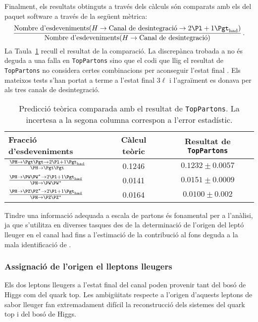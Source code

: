 Finalment, els resultats obtinguts a través dels càlculs són comparats amb els del paquet software a través de la següent mètrica:
\begin{equation*}
\frac{\text{Nombre d'esdeveniments}(H \rightarrow \text{Canal de desintegració} \rightarrow \dileptau)}{\text{Nombre d'esdeveniments}(H \rightarrow \text{Canal de desintegració)}}\, .
\end{equation*}
La Taula~\ref{tab:Resum:ChaptH:Prediction_VS_TopPartons} recull el resultat de la comparació. La discrepànca trobada
a \HZZ no és deguda a una falla en \texttt{TopPartons} sino que el codi que llig el resultat de \texttt{TopPartons} no considera
certes combinacions per aconseguir l'estat final \dileptau. Els mateixos tests s'han portat a terme a l'estat final $3\ell$ i l'agraïment
es donava per als tres canals de desintegració.

\begin{table}[]
\centering
\begin{tabular}{l|c|c}
\toprule
Fracció d'esdeveniments								&   Càlcul teòric   	& Resultat de \texttt{TopPartons} \\
\midrule
$\frac{\Htautau \rightarrow \dileptau }{\Htautau}$  	&   0.1246         	&  $0.1232  \pm 0.0057$ 	\\ 
$\frac{\HWW 	\rightarrow \dileptau}{\HWW}$       	&   0.0141        		&  $0.0151  \pm 0.0009$   \\ 
$\frac{\HZZ 	\rightarrow \dileptau }{\HZZ}$           	&   0.0164         	&  $0.0100  \pm 0.002$     \\ \bottomrule

\end{tabular}
\caption{Predicció teòrica comparada amb el resultat de \texttt{TopPartons}. La incertesa a la segona columna correspon
a l'error estadístic. }
\label{tab:Resum:ChaptH:Prediction_VS_TopPartons}
\end{table}


Tindre una informació adequada a escala de partons és fonamental per a l'anàlisi, ja que s'utilitza en diverses tasques
des de la determinació de l'origen del leptó lleuger en el canal \dilepSStau had fins a l'estimació de la contribució al fons 
deguda a la mala identificació de \tauhad.


\subsubsection{Assignació de l'origen el lleptons lleugers}
\label{chap:resumen_val:tHq:Senyal:origin}
Els dos leptons lleugers a l'estat final del canal \dileptau poden provenir tant del bosó de Higgs com del quark top.
Les ambigüitats respecte a l'origen d'aquests leptons de sabor lleuger fan extremadament difícil la reconstrucció dels
sistemes del quark top i del bosó de Higgs.

